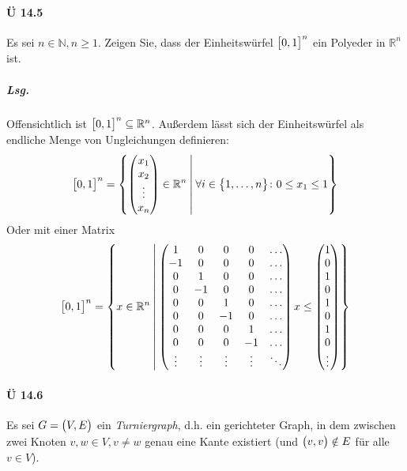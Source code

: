 \documentclass{scrreprt}
\begin{document}
\newpage
\paragraph{Ü 14.5} Es sei $n \in \mathbb{N}, n \geq 1$.
Zeigen Sie, dass der Einheitswürfel $\qty\big[0, 1]^n$ ein Polyeder in
$\mathbb{R}^n$ ist.

\subparagraph{Lsg.} Offensichtlich ist $\qty\big[0, 1]^n \subseteq \mathbb{R}^n$.
Außerdem lässt sich der Einheitswürfel als endliche Menge von Ungleichungen
definieren:
\[
  \qty\big[0, 1]^n = \qty{
    \begin{pmatrix}
      x_1     \\
      x_2     \\
      \vdots \\
      x_n     \\
    \end{pmatrix} \in \mathbb{R}^n
    \:\middle|\:
    \forall i \in \qty\big{1, \ldots, n} \colon 0 \leq x_1 \leq 1
  }
\]
Oder mit einer Matrix
\[
  \qty\big[0, 1]^n = \qty{
    x \in \mathbb{R}^n
    \:\middle|\:
    \begin{pmatrix}
      1  & 0  & 0  & 0  & \ldots \\
      -1 & 0  & 0  & 0  & \ldots \\
      0  & 1  & 0  & 0  & \ldots \\
      0  & -1 & 0  & 0  & \ldots \\
      0  & 0  & 1  & 0  & \ldots \\
      0  & 0  & -1 & 0  & \ldots \\
      0  & 0  & 0  & 1  & \ldots \\
      0  & 0  & 0  & -1 & \ldots \\
      \vdots & \vdots & \vdots & \vdots & \ddots \\
    \end{pmatrix}
    x \leq \begin{pmatrix}
      1 \\
      0 \\
      1 \\
      0 \\
      1 \\
      0 \\
      1 \\
      0 \\
      \vdots
    \end{pmatrix}
  }
\]

\paragraph{Ü 14.6} Es sei $G = \qty\big(V, E)$ ein \emph{Turniergraph}, d.h. ein
gerichteter Graph, in dem zwischen zwei Knoten $v, w \in V, v \ne w$ genau eine
Kante existiert (und $\qty\big(v, v) \notin E$ für alle $v \in V$).
\end{document}
